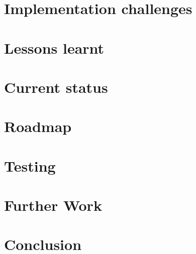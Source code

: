 \documentclass[10pt, conference, compsocconf]{IEEEtran}
\begin{document}
\section{Implementation challenges}
\label{sec:challenges}


\section{Lessons learnt}
\label{sec:lessons}


\section{Current status}
\label{sec:status}


\section{Roadmap}
\label{sec:roadmap}


\section{Testing}
\label{sec:testing}


\section{Further Work}
\label{sec:further}


\section{Conclusion}
\label{sec:conclusion}




\end{document}
